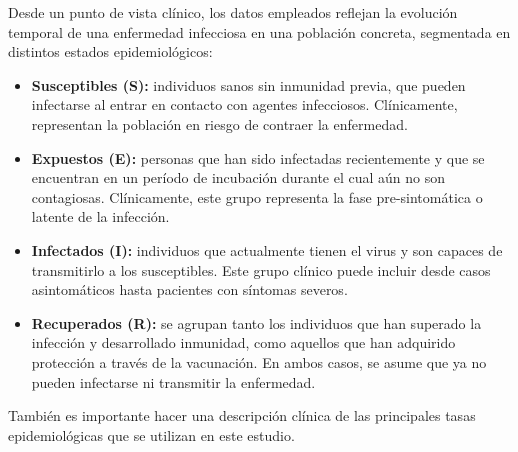 Desde un punto de vista clínico, los datos empleados reflejan la evolución temporal de una enfermedad infecciosa en una población concreta, segmentada en distintos estados epidemiológicos:

\begin{itemize}
    \item \textbf{Susceptibles (S):} individuos sanos sin inmunidad previa, que pueden infectarse al entrar en contacto con agentes infecciosos. Clínicamente, representan la población en riesgo de contraer la enfermedad.
    \item \textbf{Expuestos (E):} personas que han sido infectadas recientemente y que se encuentran en un período de incubación durante el cual aún no son contagiosas. Clínicamente, este grupo representa la fase pre-sintomática o latente de la infección.
    \item \textbf{Infectados (I):} individuos que actualmente tienen el virus y son capaces de transmitirlo a los susceptibles. Este grupo clínico puede incluir desde casos asintomáticos hasta pacientes con síntomas severos.
    \item \textbf{Recuperados (R):} se agrupan tanto los individuos que han superado la infección y desarrollado inmunidad, como aquellos que han adquirido protección a través de la vacunación. En ambos casos, se asume que ya no pueden infectarse ni transmitir la enfermedad.
\end{itemize}

También es importante hacer una descripción clínica de las principales tasas epidemiológicas que se utilizan en este estudio.



